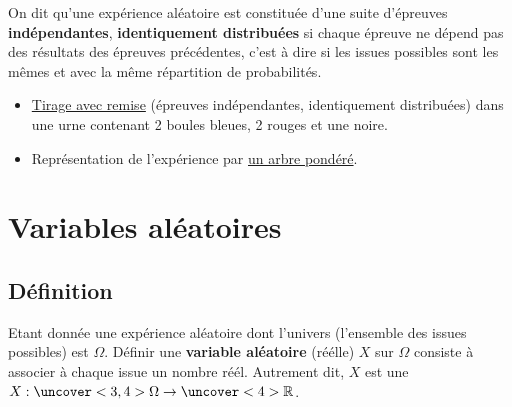 \documentclass{beamer}
\begin{document}
   \begin{frame}
   \begin{definition}
   On dit qu'une expérience aléatoire est constituée d'une suite d'épreuves \textbf{indépendantes},
   \textbf{identiquement distribuées} si chaque épreuve ne dépend pas des résultats des épreuves 
   précédentes, c'est à dire si les issues possibles sont les mêmes et avec la même répartition
   de probabilités.
  \end{definition}
  
    \end{frame}
     
   \begin{example}[Page 319]
   
   \begin{itemize}

    \item 
    \href{https://github.com/mathlorgues/math1sd1516/blob/master/Chapitres/6.%20Probabilit%C3%A9s/Images/tirageRemise.png}
  {Tirage avec remise} (épreuves indépendantes, identiquement distribuées)
    dans une urne contenant 2 boules bleues, 2 rouges et une noire.

  \item Représentation de l'expérience par
  \href{https://raw.githubusercontent.com/EdisonLorgues1SD1617/Math1SD1617/master/Donn%C3%A9es/Chapitres/6.%20Probabilit%C3%A9s/Images/arbrePondere.png}
   {un arbre pondéré}.

   \end{itemize}
  \end{example}

  
  
  \section{Variables aléatoires}
  
  \subsection{Définition}
  
  \begin{frame}
   \begin{definition}
      Etant donnée une expérience aléatoire dont l'univers (l'ensemble des issues possibles) est 
      $\Omega$. Définir une \textbf{variable aléatoire} (réélle) $X$ sur $\Omega$ consiste à associer à
      chaque issue un nombre réél. Autrement dit, $X$ est une 
      $X:\uncover<3,4>{\Omega} \to \uncover<4>{\mathbb{R}}$.
   \end{definition}
  \end{frame}
  
\end{document}
